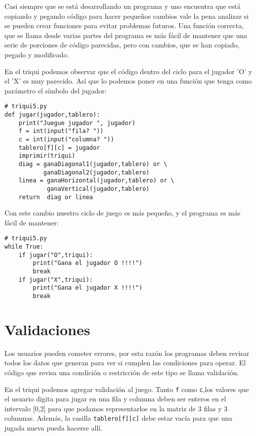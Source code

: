 
Casi siempre que se está desarrollando un programa y uno encuentra
que está copiando y pegando código para hacer pequeños cambios vale
la pena analizar si se pueden crear funciones para evitar problemas
futuros. Una función correcta, que se llama desde varias partes del
programa es más fácil de mantener que una serie de porciones de código
parecidas, pero con cambios, que se han copiado, pegado y modificado.

En el triqui podemos observar que el código dentro del ciclo para
el jugador 'O' y el 'X' es muy parecido. Así que lo podemos poner
en una función que tenga como parámetro el símbolo del jugador:

\begin{lstlisting}
# triqui5.py
def jugar(jugador,tablero):
    print("Juegue jugador ", jugador)
    f = int(input("fila? "))
    c = int(input("columna? "))
    tablero[f][c] = jugador
    imprimir(triqui)
    diag = ganaDiagonal1(jugador,tablero) or \
           ganaDiagonal2(jugador,tablero)
    linea = ganaHorizontal(jugador,tablero) or \ 
            ganaVertical(jugador,tablero)
    return  diag or linea
\end{lstlisting}

Con este cambio nuestro ciclo de juego es más pequeño, y el programa
es más fácil de mantener:

\begin{lstlisting}
# triqui5.py
while True:
    if jugar("O",triqui):
        print("Gana el jugador O !!!!")
        break
    if jugar("X",triqui):
        print("Gana el jugador X !!!!")
        break
\end{lstlisting}

\section{Validaciones}


Los usuarios pueden cometer errores, por esta razón los programas
deben revisar todos los datos que generan para ver si cumplen las
condiciones para operar. El código que revisa una condición o restricción
de este tipo se llama validación.

En el triqui podemos agregar validación al juego. Tanto \texttt{f}
como \texttt{c},los valores que el usuario digita para jugar en una
fila y columna deben ser enteros en el intervalo {[}0,2{]} para que
podamos representarlos en la matriz de 3 filas y 3 columnas. Además,
la casilla \texttt{tablero{[}f{]}{[}c{]}} debe estar vacía para que
una jugada nueva pueda hacerse allí.

